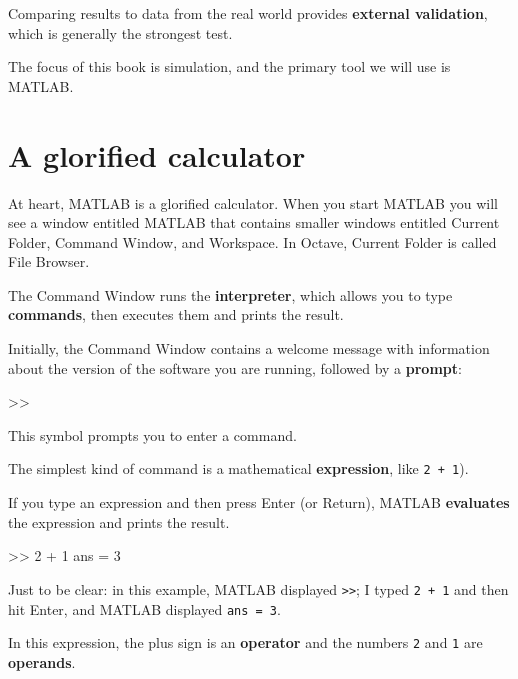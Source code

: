 \documentclass[main.tex]{subfiles}
\begin{document}

Comparing results to data from the real world provides {\bf external validation}, which is generally the strongest test.

The focus of this book is simulation, 
and the primary tool we will use is MATLAB.


\section{A glorified calculator}
\label{sect:calc}

At heart, MATLAB is a glorified calculator.  When you start MATLAB
you will see a window
entitled {\sf MATLAB} that contains smaller windows entitled {\sf
Current Folder}, {\sf Command Window}, and {\sf Workspace}.
In Octave, {\sf Current Folder} is called {\sf File Browser}.


The Command Window runs the {\bf interpreter}, which allows you
to type {\bf commands}, then executes them and prints the
result.


Initially, the Command Window contains a welcome message with information
about the version of the software you are running, followed by a {\bf prompt}:

\begin{code}
>>
\end{code}

This symbol prompts you to enter a command.

The simplest kind of command is a mathematical {\bf expression},
like {\tt 2 + 1}).


If you type an expression and then press Enter (or Return), MATLAB
{\bf evaluates} the expression and prints the result.

\begin{code}
>> 2 + 1
ans = 3
\end{code}

Just to be clear: in this example, MATLAB displayed {\tt >>}; I
typed {\tt 2 + 1} and then hit Enter, and MATLAB displayed {\tt ans = 3}.


In this expression, the plus sign is an {\bf operator} and the numbers {\tt 2} and {\tt 1} are {\bf operands}.
\end{document}
